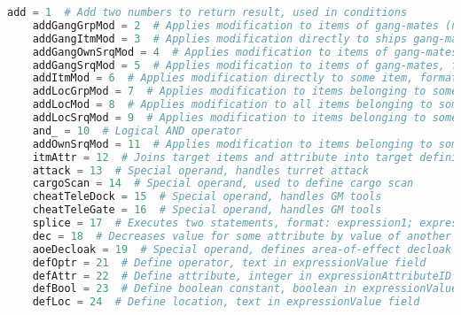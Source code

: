 
\begin{lstlisting}[language=python, caption=Dogma operands]
add = 1  # Add two numbers to return result, used in conditions
    addGangGrpMod = 2  # Applies modification to items of gang-mates (not used in any effect), filtered by group, format: [(groupFilter.targetAttribute).(operator)].AGGM(sourceAttribute)
    addGangItmMod = 3  # Applies modification directly to ships gang-mates, format: ((targetAttribute).(operator)).AGIM(sourceAttribute)
    addGangOwnSrqMod = 4  # Applies modification to items of gang-mates (not used in any effect), filtered by owner and skill requirement
    addGangSrqMod = 5  # Applies modification to items of gang-mates, filtered by skill requirement, format: (skillRequirement.targetAttribute).(operator)).AGRSM(sourceAttribute))
    addItmMod = 6  # Applies modification directly to some item, format: ((location->targetAttribute).(operator)).AIM(sourceAttribute)
    addLocGrpMod = 7  # Applies modification to items belonging to some location, filtered by group, format: ((location..groupFilter->targetAttribute).(operator)).ALGM(sourceAttribute)
    addLocMod = 8  # Applies modification to all items belonging to some location, format: ((location->targetAttribute).(operator)).ALM(sourceAttribute)
    addLocSrqMod = 9  # Applies modification to items belonging to some location, filtered by skill requirement, format: ((location[skillRequirement]->targetAttribute).(operator)).ALRSM(sourceAttribute)
    and_ = 10  # Logical AND operator
    addOwnSrqMod = 11  # Applies modification to items belonging to some location, filtered by owner of source, format: ((location[skillRequirement]->targetAttribute).(operator)).AORSM(sourceAttribute)
    itmAttr = 12  # Joins target items and attribute into target definition, format: location->targetAttribute
    attack = 13  # Special operand, handles turret attack
    cargoScan = 14  # Special operand, used to define cargo scan
    cheatTeleDock = 15  # Special operand, handles GM tools
    cheatTeleGate = 16  # Special operand, handles GM tools
    splice = 17  # Executes two statements, format: expression1; expression2
    dec = 18  # Decreases value for some attribute by value of another one
    aoeDecloak = 19  # Special operand, defines area-of-effect decloak
    defOptr = 21  # Define operator, text in expressionValue field
    defAttr = 22  # Define attribute, integer in expressionAttributeID field
    defBool = 23  # Define boolean constant, boolean in expressionValue field
    defLoc = 24  # Define location, text in expressionValue field

\end{lstlisting}
